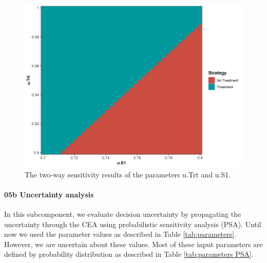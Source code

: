 \documentclass[]{article}
\let\oldparagraph\paragraph
\renewcommand{\paragraph}[1]{\oldparagraph{#1}\mbox{}}
\begin{document}
\begin{figure}
\centering
\includegraphics{../figs/05a_twsa-uS1-uTrt-nmb.png}
\caption{The two-way sensitivity results of the parameters u.Trt and
u.S1. \label{fig:05a_twsa-uS1-uTrt-nmb.png}}
\end{figure}

\paragraph{05b Uncertainty analysis}\label{b-uncertainty-analysis}

In this subcomponent, we evaluate decision uncertainty by propagating
the uncertainty through the CEA using probabilistic sensitivity analysis
(PSA). Until now we used the parameter values as described in Table
\ref{tab:parameters}. However, we are uncertain about these values. Most
of these input parameters are defined by probability distribution as
described in Table \ref{tab:parameters PSA}.
\end{document}
